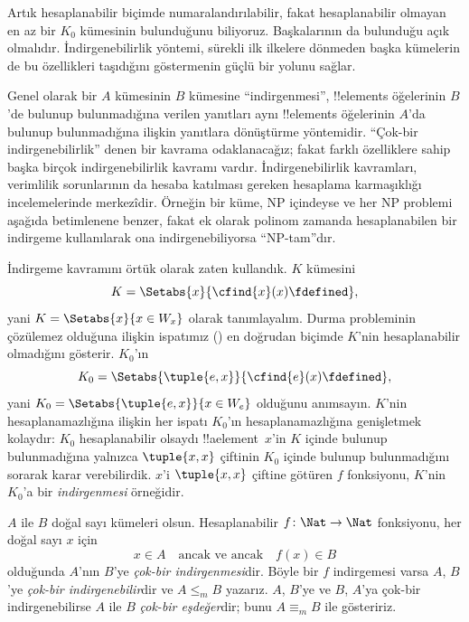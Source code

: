 


\begin{explain}
Artık hesaplanabilir biçimde numaralandırılabilir, fakat hesaplanabilir
olmayan en az bir $K_0$ kümesinin bulunduğunu biliyoruz. Başkalarının da
bulunduğu açık olmalıdır. İndirgenebilirlik yöntemi, sürekli ilk ilkelere
dönmeden başka kümelerin de bu özellikleri taşıdığını göstermenin güçlü bir
yolunu sağlar.

Genel olarak bir $A$ kümesinin $B$ kümesine ``indirgenmesi'', !!{element}s
öğelerinin $B$'de bulunup bulunmadığına verilen yanıtları aynı !!{element}s
öğelerinin $A$'da bulunup bulunmadığına ilişkin yanıtlara dönüştürme
yöntemidir. ``Çok-bir indirgenebilirlik'' denen bir kavrama odaklanacağız;
fakat farklı özelliklere sahip başka birçok indirgenebilirlik kavramı vardır.
İndirgenebilirlik kavramları, verimlilik sorunlarının da hesaba katılması
gereken hesaplama karmaşıklığı incelemelerinde merkezîdir. Örneğin bir küme,
NP içindeyse ve her NP problemi aşağıda betimlenene benzer, fakat ek olarak
polinom zamanda hesaplanabilen bir indirgeme kullanılarak ona
indirgenebiliyorsa ``NP-tam''dır.

İndirgeme kavramını örtük olarak zaten kullandık. $K$ kümesini
\[
  K=\Setabs{x}{\cfind{x}(x)\fdefined},
\]
yani $K=\Setabs{x}{x\in W_x}$ olarak tanımlayalım. Durma probleminin
çözülemez olduğuna ilişkin ispatımız () en
doğrudan biçimde $K$'nin hesaplanabilir olmadığını gösterir. $K_0$'ın
\[
  K_0=\Setabs{\tuple{e,x}}{\cfind{e}(x)\fdefined},
\]
yani $K_0=\Setabs{\tuple{e,x}}{x\in W_e}$ olduğunu anımsayın. $K$'nin
hesaplanamazlığına ilişkin her ispatı $K_0$'ın hesaplanamazlığına genişletmek
kolaydır: $K_0$ hesaplanabilir olsaydı !!a{element}~$x$'in $K$ içinde bulunup
bulunmadığına yalnızca $\tuple{x,x}$ çiftinin $K_0$ içinde bulunup
bulunmadığını sorarak karar verebilirdik. $x$'i $\tuple{x,x}$ çiftine
götüren $f$ fonksiyonu, $K$'nin $K_0$'a bir \emph{indirgenmesi} örneğidir.
\end{explain}

\begin{defn}
$A$ ile $B$ doğal sayı kümeleri olsun. Hesaplanabilir
$f\colon\Nat\to\Nat$ fonksiyonu, her doğal sayı $x$ için
\[
  x\in A \quad\text{ancak ve ancak}\quad f(x)\in B
\]
olduğunda $A$'nın $B$'ye \emph{çok-bir indirgenmesi}dir. Böyle bir $f$
indirgemesi varsa $A$, $B$'ye \emph{çok-bir indirgenebilir}dir ve
$A\leq_m B$ yazarız. $A$, $B$'ye ve $B$, $A$'ya çok-bir indirgenebilirse
$A$ ile $B$ \emph{çok-bir eşdeğer}dir; bunu $A\equiv_m B$ ile gösteririz.
\end{defn}

